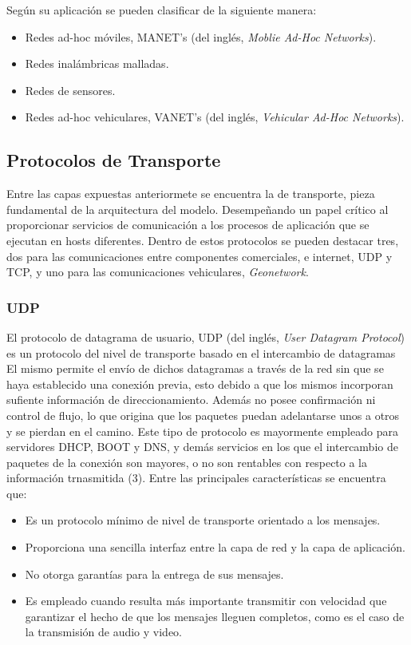  Según su aplicación se pueden clasificar de la siguiente manera: 
\begin{itemize}
	\item Redes ad-hoc móviles, MANET's (del inglés, \textit{Moblie Ad-Hoc Networks}).
	\item Redes inalámbricas malladas.
	\item Redes de sensores.
	\item Redes ad-hoc vehiculares, VANET's (del inglés, \textit{Vehicular Ad-Hoc Networks}).
\end{itemize}

\subsection{Protocolos de Transporte}

Entre las capas expuestas anteriormete se encuentra la de transporte, pieza fundamental de la arquitectura del modelo. Desempeñando un papel crítico al proporcionar servicios de comunicación a los procesos de aplicación que se ejecutan en hosts diferentes. Dentro de estos protocolos se pueden destacar tres, dos para las comunicaciones entre componentes comerciales, e internet, UDP y TCP, y uno para las comunicaciones vehiculares, \textit{Geonetwork}.

\subsubsection{UDP}

El protocolo de datagrama de usuario, UDP (del inglés, \textit{User Datagram Protocol}) es un protocolo del nivel de transporte basado en el intercambio de datagramas El mismo permite el envío de dichos datagramas a través de la red sin que se haya establecido una conexión previa, esto debido a que los mismos incorporan sufiente información de direccionamiento. Además no posee confirmación ni control de flujo, lo que origina que los paquetes puedan adelantarse unos a otros y se pierdan en el camino. Este tipo de protocolo es mayormente empleado para servidores DHCP, BOOT y DNS, y demás servicios en los que el intercambio de paquetes de la conexión son mayores, o  no son rentables con respecto a la información trnasmitida (3). Entre las principales características se encuentra que:\\

 \begin{itemize}
	\item Es un protocolo mínimo de nivel de transporte orientado a los mensajes.
	\item Proporciona una sencilla interfaz entre la capa de red y la capa de aplicación.
	\item No otorga garantías para la entrega de sus mensajes.
	\item Es empleado cuando resulta más importante transmitir con velocidad que garantizar el hecho de que los mensajes lleguen completos, como es el caso de la transmisión de audio y video.
\end{itemize}

